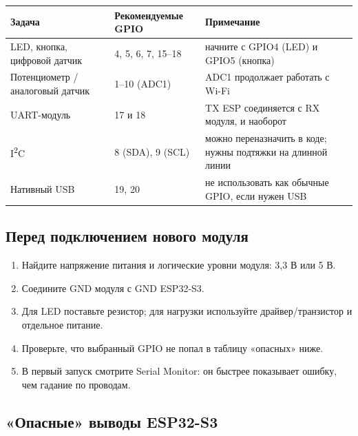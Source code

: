\begin{center}\small
\begin{tabularx}{\textwidth}{@{}l X X@{}}
\toprule
Задача & Рекомендуемые GPIO & Примечание \\
\midrule
LED, кнопка, цифровой датчик & 4, 5, 6, 7, 15--18 & начните с GPIO4 (LED) и GPIO5 (кнопка) \\
Потенциометр / аналоговый датчик & 1--10 (ADC1) & ADC1 продолжает работать с Wi-Fi \\
UART-модуль & 17 и 18 & TX ESP соединяется с RX модуля, и наоборот \\
I\textsuperscript{2}C & 8 (SDA), 9 (SCL) & можно переназначить в коде; нужны подтяжки на длинной линии \\
Нативный USB & 19, 20 & не использовать как обычные GPIO, если нужен USB \\
\bottomrule
\end{tabularx}
\end{center}

\subsection*{Перед подключением нового модуля}

\begin{enumerate}
  \item Найдите напряжение питания и логические уровни модуля: 3,3 В или 5 В.
  \item Соедините GND модуля с GND ESP32-S3.
  \item Для LED поставьте резистор; для нагрузки используйте драйвер/транзистор и отдельное питание.
  \item Проверьте, что выбранный GPIO не попал в таблицу «опасных» ниже.
  \item В первый запуск смотрите Serial Monitor: он быстрее показывает ошибку, чем гадание по проводам.
\end{enumerate}

\subsection*{«Опасные» выводы ESP32-S3}

